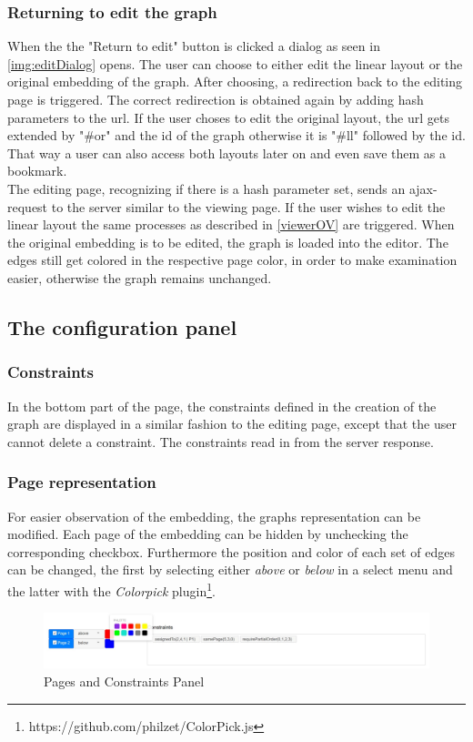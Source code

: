 \subsubsection{Returning to edit the graph}
\label{BtoEdit}
When the the "Return to edit" button is clicked a dialog as seen in \autoref{img:editDialog} opens. The user can choose to either edit the linear layout or the original embedding of the graph. After choosing, a redirection back to the editing page is triggered.
The correct redirection is obtained again by adding hash parameters to the url. If the user choses to edit the original layout, the url gets extended by "\#or" and the id of the graph otherwise it is "\#ll" followed by the id. That way a user can also access both layouts later on and even save them as a bookmark.\\
The editing page, recognizing if there is a hash parameter set, sends an ajax-request to the server similar to the viewing page. If the user wishes to edit the linear layout the same processes as described in \autoref{viewerOV} are triggered. When the original embedding is to be edited, the graph is loaded into the editor. The edges still get colored in the respective page color, in order to make examination easier, otherwise the graph remains unchanged.\\
\subsection{The configuration panel}
\subsubsection{Constraints}
In the bottom part of the page, the constraints defined in the creation of the graph are displayed in a similar fashion to the editing page, except that the user cannot delete a constraint. The constraints read in from the server response.
\subsubsection{Page representation}
For easier observation of the embedding, the graphs representation can be modified. Each page of the embedding can be hidden by unchecking the corresponding checkbox. Furthermore the position and color of each set of edges can be changed, the first by selecting either \textit{above} or \textit{below} in a select menu and the latter with the \textit{Colorpick} plugin\footnote{https://github.com/philzet/ColorPick.js}.
\begin{figure}[!h]
\begin{center}
\includegraphics[width=1\textwidth]{figures/figSecond/ConfigPanel.jpg}
\caption{Pages and Constraints Panel}
\label{img:plzhltr}
\end{center}
\end{figure}

\clearpage
